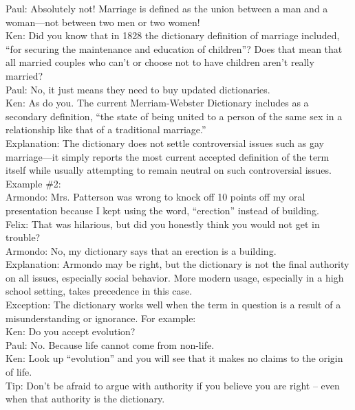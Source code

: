 \documentclass[a4paper,12pt,single,pdftex]{scrbook}
\begin{document}
{    
      Paul: Absolutely not!  Marriage is defined as the union between a man and a woman—not between two men or two women!
    \\

    
      Ken: Did you know that in 1828 the dictionary definition of marriage included, “for securing the maintenance and education of children”?  Does that mean that all married couples who can’t or choose not to have children aren’t really married?
    \\

    
      Paul: No, it just means they need to buy updated dictionaries.
    \\

    
      Ken: As do you.  The current Merriam-Webster Dictionary includes as a secondary definition, “the state of being united to a person of the same sex in a relationship like that of a traditional marriage.”
    \\

    
      Explanation: The dictionary does not settle controversial issues such as gay marriage—it simply reports the most current accepted definition of the term itself while usually attempting to remain neutral on such controversial issues.
    \\

    
      Example \#2:
    \\

    
      Armondo: Mrs. Patterson was wrong to knock off 10 points off my oral presentation because I kept using the word, “erection” instead of building.
    \\

    
      Felix: That was hilarious, but did you honestly think you would not get in trouble?
    \\

    
      Armondo:  No, my dictionary says that an erection is a building.
    \\

    
      Explanation: Armondo may be right, but the dictionary is not the final authority on all issues, especially social behavior.  More modern usage, especially in a high school setting, takes precedence in this case.
    \\

    
      Exception: The dictionary works well when the term in question is a result of a misunderstanding or ignorance.  For example:
    \\

    
      Ken: Do you accept evolution?
    \\

    
      Paul: No. Because life cannot come from non-life.
    \\

    
      Ken: Look up “evolution” and you will see that it makes no claims to the origin of life.
    \\

    
      Tip: Don’t be afraid to argue with authority if you believe you are right -- even when that authority is the dictionary.
    \\

  }
\end{document}
